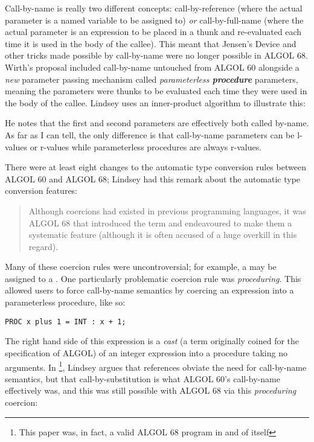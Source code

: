 Call-by-name is really two different concepts:
call-by-reference (where the actual parameter is a named variable to
be assigned to) \textit{or} call-by-full-name (where the actual parameter
is an expression to be placed in a thunk and re-evaluated each time
it is used in the body of the callee). This meant that Jensen's Device
and other tricks made possible by call-by-name were no longer possible
in ALGOL 68.
Wirth's proposal included call-by-name untouched from ALGOL 60 alongside
a \textit{new} parameter passing mechanism called \textit{parameterless \textbf{procedure}}
parameters, meaning the parameters were thunks to be evaluated each time they
were used in the body of the callee\cite{a_history_of_algol_68_1993}.
Lindsey uses an inner-product algorithm to illustrate this:



He notes that the first and second parameters are effectively both called by-name.
As far as I can tell, the only difference is that call-by-name parameters can
be l-values or r-values while parameterless procedures are always r-values.

There were at least eight changes to the automatic type conversion rules
between ALGOL 60 and ALGOL 68;
Lindsey had this remark about the automatic type conversion features:
\begin{quotation}
	Although coercions had existed in previous programming languages, it was ALGOL
	68 that introduced the term and endeavoured to make them a systematic feature
	(although it is often accused of a huge overkill in this regard).
\end{quotation}

Many of these coercion rules were uncontroversial; for example, a 
may be assigned to a .
One particularly problematic coercion rule was \textit{proceduring}.
This allowed users to force call-by-name semantics by coercing an expression
into a parameterless procedure, like so:

\begin{lstlisting}[language=algol,frame=single]
      PROC x plus 1 = INT : x + 1;
\end{lstlisting}

The right hand side of this expression is a \textit{cast}
(a term originally coined for the specification of ALGOL)
of an integer expression into a procedure taking no arguments.
In 
\footnote{This paper was, in fact, a valid ALGOL 68 program in and of itself},
Lindsey argues that references
obviate the need for call-by-name semantics, but that call-by-substitution is what
ALGOL 60's call-by-name effectively was, and this was still possible with ALGOL 68
via this \textit{proceduring} coercion:

